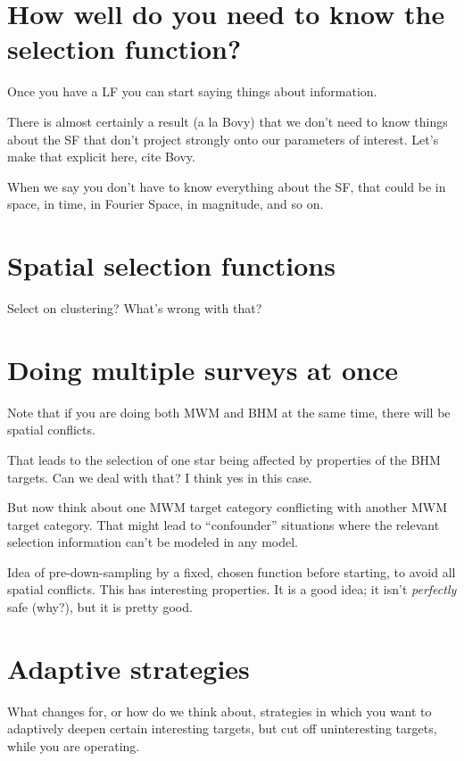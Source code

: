 \documentclass[modern]{aastex62}
\begin{document}
\section{How well do you need to know the selection function?}\label{sec:quality}

Once you have a LF you can start saying things about information.

There is almost certainly a result (a la Bovy) that we don't need to know
things about the SF that don't project strongly onto our parameters of interest.
Let's make that explicit here, cite Bovy.

When we say you don't have to know everything about the SF, that could be
in space, in time, in Fourier Space, in magnitude, and so on.

\section{Spatial selection functions}

Select on clustering? What's wrong with that?

\section{Doing multiple surveys at once}

Note that if you are doing both MWM and BHM at the same time, there will be
spatial conflicts.

That leads to the selection of one star being affected by properties of the
BHM targets. Can we deal with that? I think yes in this case.

But now think about one MWM target category conflicting with another MWM target
category. That might lead to ``confounder'' situations where the relevant selection
information can't be modeled in any model.

Idea of pre-down-sampling by a fixed, chosen function before starting, to avoid
all spatial conflicts. This has interesting properties. It is a good idea; it isn't
\emph{perfectly} safe (why?), but it is pretty good.

\section{Adaptive strategies}

What changes for, or how do we think about, strategies in which you want to
adaptively deepen certain interesting targets, but cut off uninteresting targets,
while you are operating.
\end{document}

